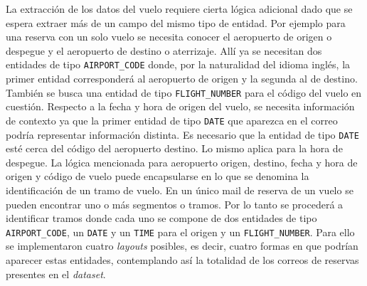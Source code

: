 La extracción de los datos del vuelo requiere cierta lógica adicional dado que se espera extraer más de un campo del
mismo tipo de entidad.
Por ejemplo para una reserva con un solo vuelo se necesita conocer el aeropuerto de origen o despegue y el aeropuerto de
destino o aterrizaje.
Allí ya se necesitan dos entidades de tipo \texttt{AIRPORT\_CODE} donde, por la naturalidad del idioma inglés, la primer
entidad corresponderá al aeropuerto de origen y la segunda al de destino.
También se busca una entidad de tipo \texttt{FLIGHT\_NUMBER} para el código del vuelo en cuestión.
Respecto a la fecha y hora de origen del vuelo, se necesita información de contexto ya que la primer entidad de tipo
\texttt{DATE} que aparezca en el correo podría representar información distinta.
Es necesario que la entidad de tipo \texttt{DATE} esté cerca del código del aeropuerto destino.
Lo mismo aplica para la hora de despegue.
La lógica mencionada para aeropuerto origen, destino, fecha y hora de origen y código de vuelo puede encapsularse en lo
que se denomina la identificación de un tramo de vuelo.
En un único mail de reserva de un vuelo se pueden encontrar uno o más segmentos o tramos.
Por lo tanto se procederá a identificar tramos donde cada uno se compone de dos entidades de tipo
\texttt{AIRPORT\_CODE}, un \texttt{DATE} y un \texttt{TIME} para el origen y un \texttt{FLIGHT\_NUMBER}.
Para ello se implementaron cuatro \textit{layouts} posibles, es decir, cuatro formas en que podrían aparecer estas
entidades, contemplando así la totalidad de los correos de reservas presentes en el \textit{dataset}.

